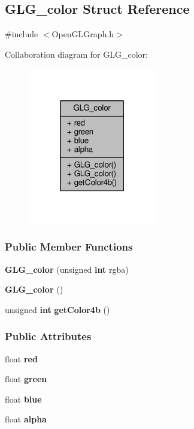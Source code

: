 \subsection{G\+L\+G\+\_\+color Struct Reference}
\label{structGLG__color}


{\ttfamily \#include $<$Open\+G\+L\+Graph.\+h$>$}



Collaboration diagram for G\+L\+G\+\_\+color\+:
\nopagebreak
\begin{figure}[H]
\begin{center}
\leavevmode
\includegraphics[width=159pt]{d8/d5f/structGLG__color__coll__graph}
\end{center}
\end{figure}
\subsubsection*{Public Member Functions}
\begin{DoxyCompactItemize}
\item 
{\bf G\+L\+G\+\_\+color} (unsigned {\bf int} rgba)
\item 
{\bf G\+L\+G\+\_\+color} ()
\item 
unsigned {\bf int} {\bf get\+Color4b} ()
\end{DoxyCompactItemize}
\subsubsection*{Public Attributes}
\begin{DoxyCompactItemize}
\item 
float {\bf red}
\item 
float {\bf green}
\item 
float {\bf blue}
\item 
float {\bf alpha}
\end{DoxyCompactItemize}


